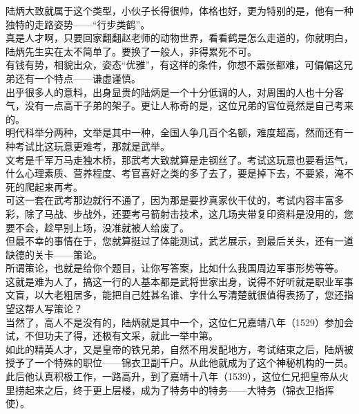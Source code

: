 \begin{multicols}{\theparacolNo}
陆炳大致就属于这个类型，小伙子长得很帅，体格也好，更为特别的是，他有一种独特的走路姿势——“行步类鹤”。\\

真是人才啊，只要回家翻翻赵老师的动物世界，看看鹤是怎么走道的，你就明白，陆炳先生实在太不简单了。要换了一般人，非得累死不可。\\

有钱有势，相貌出众，姿态“优雅”，有这样的条件，你想不嚣张都难，可偏偏这兄弟还有一个特点——谦虚谨慎。\\

出乎很多人的意料，出身显贵的陆炳是一个十分低调的人，对周围的人也十分客气，没有一点高干子弟的架子。更让人称奇的是，这位兄弟的官位竟然是自己考来的。\\

明代科举分两种，文举是其中一种，全国人争几百个名额，难度超高，然而还有一种考试比这玩意更难考，那就是武举。\\

文考是千军万马走独木桥，那武考大致就算是走钢丝了。考试这玩意也要看运气，什么心理素质、营养程度、考官喜好之类的多了去了，要是掉下去，不要紧，淹不死的爬起来再考。\\

可这一套在武考那边就行不通了，因为那是要抄真家伙干仗的，考试内容丰富多彩，除了马战、步战外，还要考弓箭射击技术，这几场夹带复印资料是没用的，您要不会，趁早别上场，没准就被人给废了。\\

但最不幸的事情在于，您就算挺过了体能测试，武艺展示，到最后关头，还有一道缺德的关卡——策论。\\

所谓策论，也就是给你个题目，让你写答案，比如什么我国周边军事形势等等。\\

这就是难为人了，搞这一行的人基本都是武将世家出身，说得不好听就是职业军事文盲，以大老粗居多，能把自己姓甚名谁、字什么写清楚就很值得表扬了，您还指望这帮人写策论？\\

当然了，高人不是没有的，陆炳就是其中一个，这位仁兄嘉靖八年（1529）参加会试，不但功夫了得，还极有文采，就此一举中第。\\

如此的精英人才，又是皇帝的铁兄弟，自然不用发配地方，考试结束之后，陆炳被授予了一个特殊的职位——锦衣卫副千户。从此他就成为了这个神秘机构的一员。\\

此后他认真积极工作，一路高升，到了嘉靖十八年（1539），这位仁兄把皇帝从火里捞起来之后，终于更上层楼，成为了特务中的特务——大特务（锦衣卫指挥使）。\\


\end{multicols}
